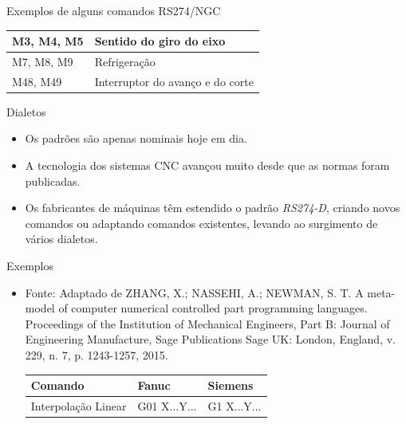 \documentclass[aspectratio=169]{beamer}
\begin{document}
{\begin{frame}{Exemplos de alguns comandos RS274/NGC}
\begin{table}[H]
\begin{tabular}{p{7cm}|p{5cm}}
      \hline
      \scriptsize{M3, M4, M5}
      & \scriptsize{Sentido do giro do eixo} \\
  
      \hline
      \scriptsize{M7, M8, M9}
      & \scriptsize{Refrigera\c c\~ao} \\
  
      \hline
      \scriptsize{M48, M49}
      & \scriptsize{Interruptor do avan\c co e do corte} \\

      \hline
  
    \end{tabular}
  \end{table}

\end{frame}


\begin{frame}{Dialetos}
  \begin{itemize}
  \item {
    Os padrões são apenas nominais hoje em dia.     
  }
  \item {   
    A tecnologia dos sistemas CNC avançou muito desde que as normas 
    foram publicadas.
  }
  \item {
    Os fabricantes de máquinas têm estendido o padrão \emph{RS274-D}, 
    criando novos comandos ou adaptando comandos existentes, levando 
    ao surgimento de vários dialetos. 
  }
  \end{itemize}
\end{frame}


\begin{frame}{Exemplos}
  \begin{itemize}
    \item {
      Fonte: Adaptado de ZHANG, X.; NASSEHI, A.; NEWMAN, S. T. A meta-model of computer numerical
      controlled part programming languages. Proceedings of the Institution of
      Mechanical Engineers, Part B: Journal of Engineering Manufacture, Sage
      Publications Sage UK: London, England, v. 229, n. 7, p. 1243-1257, 2015.
      \begin{table}[H]
        \centering    
        {\begin{tabular}{p{4.3cm}|p{2.6cm}|p{2.4cm}}
          \hline
          \bfseries{\footnotesize{Comando}} & 
          \bfseries{\footnotesize{Fanuc}} & 
          \bfseries{\footnotesize{Siemens}} \\
      
          \hline
          \footnotesize{Interpolação Linear} & 
          \footnotesize{G01 X...Y...} & 
          \footnotesize{G1 X...Y...} \\
      

\end{tabular}}
\end{table}}
\end{itemize}
\end{frame}}
\end{document}
